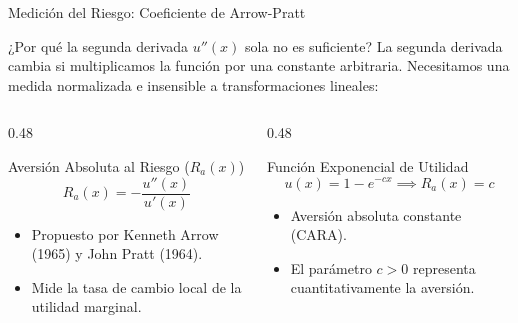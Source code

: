 \documentclass[aspectratio=169, 10pt]{beamer}
\begin{document}
\begin{frame}{Medición del Riesgo: Coeficiente de Arrow-Pratt}
    \begin{block}{¿Por qué la segunda derivada $u''(x)$ sola no es suficiente?}
        La segunda derivada cambia si multiplicamos la función por una constante arbitraria. Necesitamos una medida normalizada e insensible a transformaciones lineales:
    \end{block}
    \begin{columns}[T]
        \begin{column}{0.48\textwidth}
            \begin{exampleblock}{Aversión Absoluta al Riesgo ($R_a(x)$)}
                \begin{equation*}
                    R_a(x) = -\frac{u''(x)}{u'(x)}
                \end{equation*}
                \scriptsize
                \begin{itemize}
                    \item Propuesto por Kenneth Arrow (1965) y John Pratt (1964).
                    \item Mide la tasa de cambio local de la utilidad marginal.
                \end{itemize}
            \end{exampleblock}
        \end{column}
        
        \begin{column}{0.48\textwidth}
            \begin{exampleblock}{Función Exponencial de Utilidad}
                \begin{equation*}
                    u(x) = 1 - e^{-c x} \implies R_a(x) = c
                \end{equation*}
                \scriptsize
                \begin{itemize}
                    \item Aversión absoluta constante (CARA).
                    \item El parámetro $c > 0$ representa cuantitativamente la aversión.
                \end{itemize}
            \end{exampleblock}
        \end{column}
    \end{columns}
\end{frame}
\end{document}
